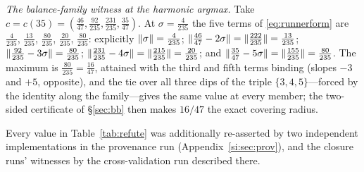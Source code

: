 \emph{The balance-family witness at the harmonic argmax.} Take
$c=c(35)=(\tfrac{46}{47},\tfrac{92}{235},\tfrac{231}{235},
\tfrac{35}{47})$. At $\sigma=\tfrac{4}{235}$ the five terms of
\eqref{eq:runnerform} are $\tfrac{4}{235}$, $\tfrac{13}{235}$,
$\tfrac{80}{235}$, $\tfrac{20}{235}$, $\tfrac{80}{235}$: explicitly
$\lVert \sigma \rVert=\tfrac4{235}$;
$\lVert \tfrac{46}{47}-2\sigma \rVert=\lVert \tfrac{222}{235} \rVert=\tfrac{13}{235}$;
$\lVert \tfrac{92}{235}-3\sigma \rVert=\tfrac{80}{235}$;
$\lVert \tfrac{231}{235}-4\sigma \rVert=\lVert \tfrac{215}{235} \rVert=\tfrac{20}{235}$;
and $\lVert \tfrac{35}{47}-5\sigma \rVert=\lVert \tfrac{155}{235} \rVert=\tfrac{80}{235}$.
The maximum is $\tfrac{80}{235}=\tfrac{16}{47}$, attained with the
third and fifth terms binding (slopes $-3$ and $+5$, opposite), and the
tie over all three dips of the triple $\{3,4,5\}$---forced by the
identity along the family---gives the same value at every member; the
two-sided certificate of \S\ref{sec:bb} then makes $16/47$ the exact
covering radius.

Every value in
Table~\ref{tab:refute} was additionally re-asserted by two independent
implementations in the provenance run (Appendix~\ref{si:sec:prov}), and
the closure runs' witnesses by the cross-validation run described
there.

